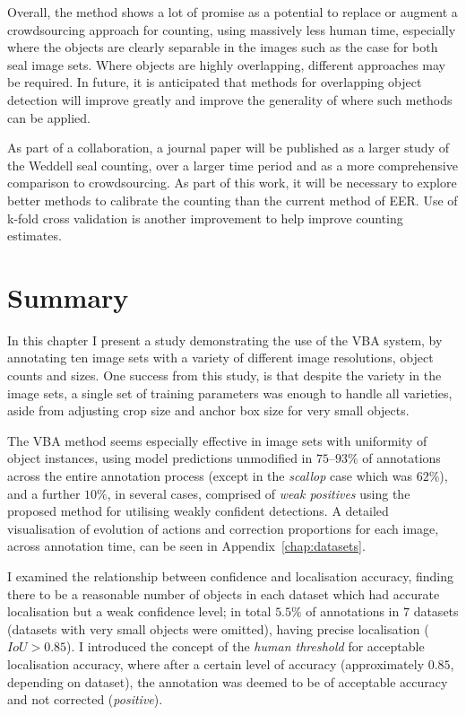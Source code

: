 Overall, the method shows a lot of promise as a potential to replace or augment a crowdsourcing approach for counting, using massively less human time, especially where the objects are clearly separable in the images such as the case for both seal image sets. Where objects are highly overlapping, different approaches may be required. In future, it is anticipated that methods for overlapping object detection will improve greatly and improve the generality of where such methods can be applied.

As part of a collaboration, a journal paper will be published as a larger study of the Weddell seal counting, over a larger time period and as a more comprehensive comparison to crowdsourcing. As part of this work, it will be necessary to explore better methods to calibrate the counting than the current method of \gls{EER}. Use of k-fold cross validation is another improvement to help improve counting estimates. 


\section{Summary}
\label{sec:summary}

In this chapter I present a study demonstrating the use of the \gls{VBA} system, by annotating ten image sets with a variety of different image resolutions, object counts and sizes. One success from this study, is that despite the variety in the image sets, a single set of training parameters was enough to handle all varieties, aside from adjusting crop size and anchor box size for very small objects.

The \gls{VBA} method seems especially effective in image sets with uniformity of object instances, using model predictions unmodified in $75$--$93\%$ of annotations across the entire annotation process (except in the \emph{scallop} case which was $62\%$), and a further $10\%$, in several cases, comprised of \emph{weak positives} using the proposed method for utilising weakly confident detections. A detailed visualisation of evolution of actions and correction proportions for each image, across annotation time, can be seen in Appendix~\ref{chap:datasets}.

I examined the relationship between confidence and localisation accuracy, finding there to be a reasonable number of objects in each dataset which had accurate localisation but a weak confidence level; in total $5.5\%$ of annotations in $7$ datasets (datasets with very small objects were omitted), having precise localisation ($ IoU > 0.85$). I introduced the concept of the \emph{human threshold} for acceptable localisation accuracy, where after a certain level of accuracy (approximately $0.85$, depending on dataset), the annotation was deemed to be of acceptable accuracy and not corrected (\emph{positive}).

